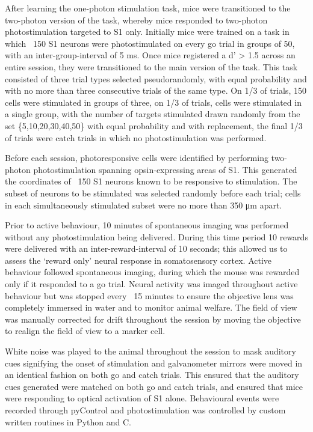 After learning the one-photon stimulation task, mice were transitioned to the two-photon version of the task, whereby mice responded to two-photon photostimulation targeted to S1 only. Initially mice were trained on a task in which ~150 S1 neurons were photostimulated on every go trial in groups of 50, with an inter-group-interval of 5 ms.  Once mice registered a d' > 1.5 across an entire session, they were transitioned to the main version of the task. This task consisted of three trial types selected pseudorandomly, with equal probability and with no more than three consecutive trials of the same type. On 1/3 of trials, 150 cells were stimulated in groups of three, on 1/3 of trials, cells were stimulated in a single group, with the number of targets stimulated drawn randomly from the set \{5,10,20,30,40,50\} with equal probability and with replacement, the final 1/3 of trials were catch trials in which no photostimulation was performed. 

Before each session, photoresponsive cells were identified by performing two-photon photostimulation spanning opsin-expressing areas of S1. This generated the coordinates of ~150 S1 neurons known to be responsive to stimulation. The subset of neurons to be stimulated was selected randomly before each trial; cells in each simultaneously stimulated subset were no more than 350 μm apart. 

Prior to active behaviour, 10 minutes of spontaneous imaging was performed without any photostimulation being delivered. During this time period 10 rewards were delivered with an inter-reward-interval of 10 seconds; this allowed us to assess the ‘reward only’ neural response in somatosensory cortex. Active behaviour followed spontaneous imaging, during which the mouse was rewarded only if it responded to a go trial. Neural activity was imaged throughout active behaviour but was stopped every ~15 minutes to ensure the objective lens was completely immersed in water and to monitor animal welfare. The field of view was manually corrected for drift throughout the session by moving the objective to realign the field of view to a marker cell.

White noise was played to the animal throughout the session to mask auditory cues signifying the onset of stimulation and galvanometer mirrors were moved in an identical fashion on both go and catch trials. This ensured that the auditory cues generated were matched on both go and catch trials, and ensured that mice were responding to optical activation of S1 alone. Behavioural events were recorded through pyControl and photostimulation was controlled by custom written routines in Python and C.


